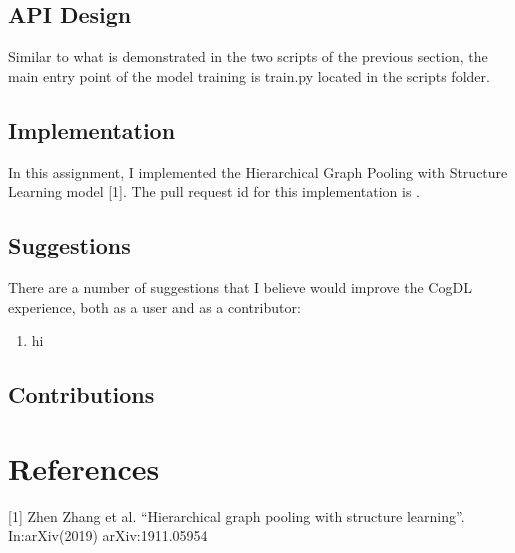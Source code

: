 \documentclass[12pt,a4paper]{article}
\begin{document}
	\subsection{API Design}
	\noindent Similar to what is demonstrated in the two scripts of the previous section, the main entry point of the model training is train.py located in the scripts folder.
	
	\subsection{Implementation}
	
	\noindent In this assignment, I implemented the Hierarchical Graph Pooling with Structure Learning model [1]. The pull request id for this implementation is . 
	
	\subsection{Suggestions}
	\noindent There are a number of suggestions that I believe would improve the CogDL experience, both as a user and as a contributor:
	\begin{enumerate}
		\item hi
	\end{enumerate}
	
	\subsection{Contributions}
	
	\vspace{0.4cm}
	\section*{References}
	[1] Zhen Zhang et al. “Hierarchical graph pooling with structure learning”. In:arXiv(2019) arXiv:1911.05954


	
\end{document}
